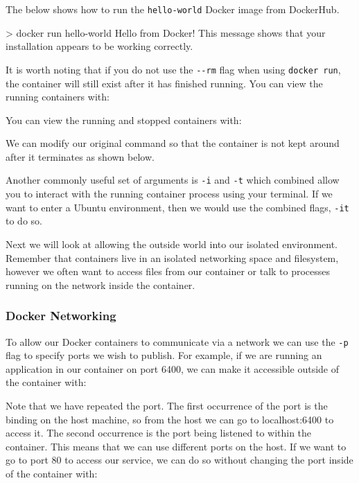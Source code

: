 \documentclass{csse4400}
\begin{document}
The below shows how to run the \texttt{hello-world} Docker image from DockerHub.

\begin{code}[language=bash,numbers=none]{}
> docker run hello-world
Hello from Docker!
This message shows that your installation appears to be working correctly.
\end{code}

It is worth noting that if you do not use the \texttt{-{}-rm} flag when using \texttt{docker run},
the container will still exist after it has finished running.
You can view the running containers with:

You can view the running and stopped containers with:

We can modify our original command so that the container is not kept around after it terminates as shown below.

Another commonly useful set of arguments is \texttt{-i} and \texttt{-t} which combined allow you to interact with the running container process using your terminal.
If we want to enter a Ubuntu environment,
then we would use the combined flags, \texttt{-it} to do so.

Next we will look at allowing the outside world into our isolated environment.
Remember that containers live in an isolated networking space and filesystem,
however we often want to access files from our container or talk to processes running on the network inside the container.

\subsubsection{Docker Networking}

To allow our Docker containers to communicate via a network we can use the \texttt{-p} flag to specify ports we wish to publish.
For example, if we are running an application in our container on port 6400,
we can make it accessible outside of the container with:

Note that we have repeated the port.
The first occurrence of the port is the binding on the host machine,
so from the host we can go to localhost:6400 to access it.
The second occurrence is the port being listened to within the container.
This means that we can use different ports on the host.
If we want to go to port 80 to access our service,
we can do so without changing the port inside of the container with:
\end{document}
